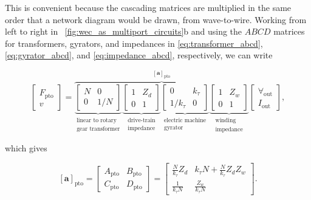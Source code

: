 \documentclass[lettersize,journal]{IEEEtran}
\begin{document}
\noindent{}This is convenient because the cascading matrices are multiplied in the same order that a network diagram would be drawn, from wave-to-wire.
Working from left to right in \figurename~\ref{fig:wec_as_multiport_circuits}b and using the $ABCD$ matrices for transformers, gyrators, and impedances in \eqref{eq:transformer_abcd}, \eqref{eq:gyrator_abcd}, and \eqref{eq:impedance_abcd}, respectively, we can write 

\begin{equation}
 	\label{eq:Z_cascade_to_ABCD}
 	\begin{bmatrix} 
 		F_{\textrm{pto}} \\
 		v 
 	\end{bmatrix} 
 	\! = \!
        \overbrace{
 	\underbrace{
        \begin{bmatrix} 
                N & 0 \\ 
                0 & 1/N 
        \end{bmatrix}
        }_{\substack{\text{linear to rotary} \\ \text{gear transformer}}}
        \underbrace{
  	\begin{bmatrix} 
	 	1 & Z_d \\ 
 		0 & 1 
	\end{bmatrix}
        }_{\substack{\text{drive-train} \\ \text{impedance}}}
        \underbrace{
   	\begin{bmatrix} 
	 	0 & k_{\tau} \\ 
	 	1/k_{\tau} & 0 
        \end{bmatrix}
        }_{\substack{\text{electric machine} \\ \text{gyrator}}}
        \underbrace{
   	\begin{bmatrix} 
	 	1 & Z_w \\ 
	 	0 & 1 
	\end{bmatrix}
        }_{\substack{\text{winding} \\ \text{impedance}}}
        }^{\left[ \mathbf{a} \right]_{\textrm{pto}}}
 	\begin{bmatrix} 
 		\forall_{\textrm{out}} \\
 		I_{\textrm{out}} 
 	\end{bmatrix} \!, 
\end{equation}

\noindent{}which gives

\begin{equation}
        \left[ \mathbf{a} \right]_{\textrm{pto}}
	= 
	\begin{bmatrix} 
		A_{\textrm{pto}} & B_{\textrm{pto}} \\ 
		C_{\textrm{pto}} & D_{\textrm{pto}} 
	\end{bmatrix}
	=
	\begin{bmatrix} 
		\frac{N}{k_{\tau}}  Z_d			& k_\tau N +\frac{N}{k_{\tau}}  Z_dZ_w  \\
		\frac{1}{k_{\tau}N}           	& \frac{Z_w}{k_{\tau}N} 
	\end{bmatrix}.
	\label{eq:pto_abcd}
\end{equation}
\end{document}
